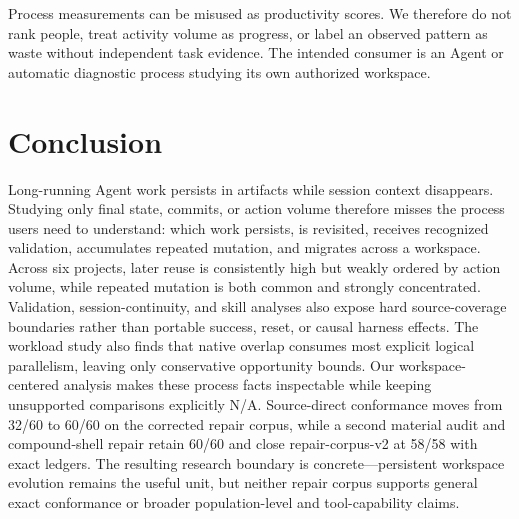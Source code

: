 \documentclass[letterpaper]{article}
\begin{document}
Process measurements can be misused as productivity scores.  We therefore do
not rank people, treat activity volume as progress, or label an observed
pattern as waste without independent task evidence.  The intended consumer is
an Agent or automatic diagnostic process studying its own authorized workspace.

\section{Conclusion}

Long-running Agent work persists in artifacts while session context disappears.
Studying only final state, commits, or action volume therefore misses the
process users need to understand: which work persists, is revisited, receives
recognized validation, accumulates repeated mutation, and migrates across a
workspace.  Across six projects, later reuse is consistently high but weakly
ordered by action volume, while repeated mutation is both common and strongly
concentrated.  Validation, session-continuity, and skill analyses also expose
hard source-coverage boundaries rather than portable success, reset, or causal
harness effects.  The workload study also finds that native overlap consumes
most explicit logical parallelism, leaving only conservative opportunity
bounds.  Our workspace-centered analysis makes these process facts inspectable
while keeping unsupported comparisons explicitly N/A.  Source-direct
conformance moves from 32/60 to 60/60 on the corrected repair corpus, while a
second material audit and compound-shell repair retain 60/60 and close
repair-corpus-v2 at 58/58 with exact ledgers.  The resulting research boundary
is concrete---persistent workspace evolution remains the useful unit, but
neither repair corpus supports general exact conformance or broader
population-level and tool-capability claims.


\end{document}
